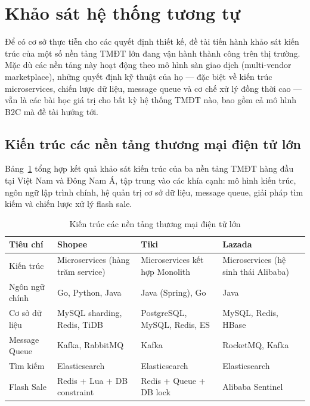 \documentclass[../DoAn.tex]{subfiles}
\begin{document}
\section{Khảo sát hệ thống tương tự}
\label{section:1.4}

Để có cơ sở thực tiễn cho các quyết định thiết kế, đề tài tiến hành khảo sát kiến trúc của
một số nền tảng TMĐT lớn đang vận hành thành công trên thị trường. Mặc dù các nền tảng này
hoạt động theo mô hình sàn giao dịch (multi-vendor marketplace), những quyết định kỹ thuật
của họ --- đặc biệt về kiến trúc microservices, chiến lược dữ liệu, message queue và cơ chế
xử lý đồng thời cao --- vẫn là các bài học giá trị cho bất kỳ hệ thống TMĐT nào, bao gồm cả
mô hình B2C mà đề tài hướng tới.

\subsection*{Kiến trúc các nền tảng thương mại điện tử lớn}

Bảng~\ref{table:survey-platforms} tổng hợp kết quả khảo sát kiến trúc của ba nền tảng TMĐT
hàng đầu tại Việt Nam và Đông Nam Á, tập trung vào các khía cạnh: mô hình kiến trúc, ngôn
ngữ lập trình chính, hệ quản trị cơ sở dữ liệu, message queue, giải pháp tìm kiếm và chiến
lược xử lý flash sale.

\begin{table}[H]
\centering
\caption{Kiến trúc các nền tảng thương mại điện tử lớn}
\label{table:survey-platforms}
\begin{tabular}{|l|p{3.2cm}|p{3.2cm}|p{3.2cm}|}
\hline
\textbf{Tiêu chí} & \textbf{Shopee} & \textbf{Tiki} & \textbf{Lazada} \\ \hline
Kiến trúc & Microservices (hàng trăm service) & Microservices kết hợp Monolith & Microservices (hệ sinh thái Alibaba) \\ \hline
Ngôn ngữ chính & Go, Python, Java & Java (Spring), Go & Java \\ \hline
Cơ sở dữ liệu & MySQL sharding, Redis, TiDB & PostgreSQL, MySQL, Redis, ES & MySQL, Redis, HBase \\ \hline
Message Queue & Kafka, RabbitMQ & Kafka & RocketMQ, Kafka \\ \hline
Tìm kiếm & Elasticsearch & Elasticsearch & Elasticsearch \\ \hline
Flash Sale & Redis + Lua + DB constraint & Redis + Queue + DB lock & Alibaba Sentinel \\ \hline
\end{tabular}
\end{table}
\end{document}
